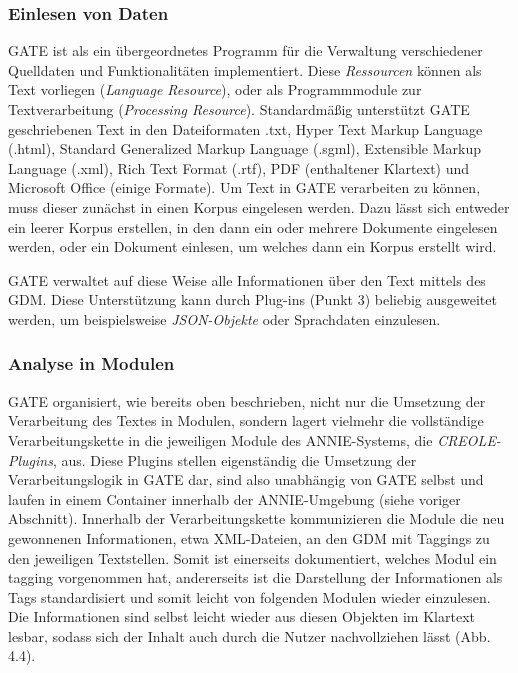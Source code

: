 \documentclass[12pt]{report}
\begin{document}
\subsubsection{Einlesen von Daten}
GATE ist als ein übergeordnetes Programm für die Verwaltung verschiedener Quelldaten und Funktionalitäten implementiert. Diese \textit{Ressourcen} können als Text vorliegen (\textit{Language Resource}), oder als Programmmodule zur Textverarbeitung (\textit{Processing Resource}). Standardmäßig unterstützt GATE geschriebenen Text in den Dateiformaten .txt, Hyper Text Markup Language (.html), Standard Generalized Markup Language (.sgml), Extensible Markup Language (.xml), Rich Text Format (.rtf), PDF (enthaltener Klartext) und Microsoft Office (einige Formate). Um Text in GATE verarbeiten zu können, muss dieser zunächst in einen Korpus eingelesen werden. Dazu lässt sich entweder ein leerer Korpus erstellen, in den dann ein oder mehrere Dokumente eingelesen werden, oder ein Dokument einlesen, um welches dann ein Korpus erstellt wird. 

GATE verwaltet auf diese Weise alle Informationen über den Text mittels des GDM. Diese Unterstützung kann durch Plug-ins (Punkt 3) beliebig ausgeweitet werden, um beispielsweise \textit{JSON-Objekte} oder Sprachdaten einzulesen.

\subsubsection{Analyse in Modulen}
GATE organisiert, wie bereits oben beschrieben, nicht nur die Umsetzung der Verarbeitung des Textes in Modulen, sondern lagert vielmehr die vollständige Verarbeitungskette in die jeweiligen Module des ANNIE-Systems, die \textit{CREOLE-Plugins}, aus. Diese Plugins stellen eigenständig die Umsetzung der Verarbeitungslogik in GATE dar, sind also unabhängig von GATE selbst und laufen in einem Container innerhalb der ANNIE-Umgebung (siehe voriger Abschnitt). Innerhalb der Verarbeitungskette kommunizieren die Module die neu gewonnenen Informationen, etwa XML-Dateien, an den GDM mit Taggings zu den jeweiligen Textstellen. Somit ist einerseits dokumentiert, welches Modul ein tagging vorgenommen hat,  andererseits ist die Darstellung der Informationen als Tags standardisiert und somit leicht von folgenden Modulen wieder einzulesen. Die Informationen sind selbst leicht wieder aus diesen Objekten im Klartext lesbar, sodass sich der Inhalt auch durch die Nutzer nachvollziehen lässt (Abb. 4.4).
\end{document}

